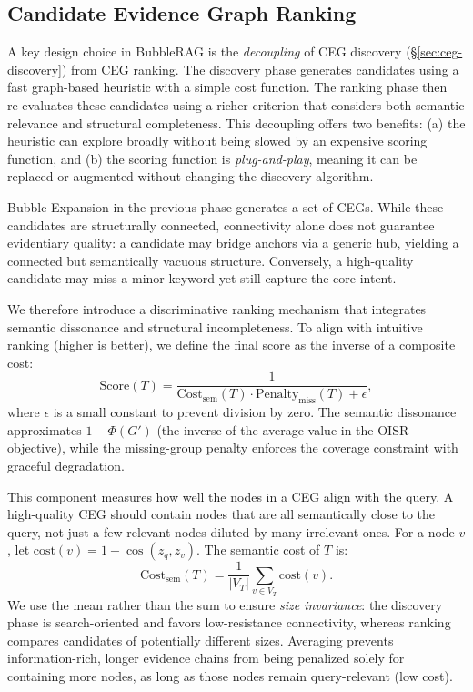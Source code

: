 \subsection{Candidate Evidence Graph Ranking}\label{sec:ceg-ranking}


A key design choice in BubbleRAG is the \emph{decoupling} of CEG discovery (\S\ref{sec:ceg-discovery}) from CEG ranking. The discovery phase generates candidates using a fast graph-based heuristic with a simple cost function. The ranking phase then re-evaluates these candidates using a richer criterion that considers both semantic relevance and structural completeness. This decoupling offers two benefits: (a) the heuristic can explore broadly without being slowed by an expensive scoring function, and (b) the scoring function is \emph{plug-and-play}, meaning it can be replaced or augmented without changing the discovery algorithm.

Bubble Expansion in the previous phase generates a set of CEGs.
While these candidates are structurally connected, connectivity alone does not
guarantee evidentiary quality: a candidate may bridge anchors via a generic hub,
yielding a connected but semantically vacuous structure. Conversely, a
high-quality candidate may miss a minor keyword yet still capture the core
intent.

We therefore introduce a discriminative ranking mechanism that integrates
semantic dissonance and structural incompleteness. To align with
intuitive ranking (higher is better), we define the final score as the inverse
of a composite cost:
\begin{equation}
\text{Score}(T) = \frac{1}{\text{Cost}_{\text{sem}}(T)\cdot \text{Penalty}_{\text{miss}}(T) + \epsilon},
\label{eq:score}
\end{equation}
where $\epsilon$ is a small constant to prevent division by zero. The semantic dissonance approximates $1 - \Phi(G')$ (the inverse of the average value in the OISR objective), while the missing-group penalty enforces the coverage constraint with graceful degradation.

This component measures how well the nodes in a CEG align with the query. A high-quality CEG should contain nodes that are all semantically close to the query, not just a few relevant nodes diluted by many irrelevant ones.
For a node $v$, let $\text{cost}(v)=1-\cos(z_q,z_v)$. The semantic
cost of $T$ is:
\[
\text{Cost}_{\text{sem}}(T) = \frac{1}{|V_T|} \sum_{v \in V_T} \text{cost}(v).
\]
We use the mean rather than the sum to ensure \textit{size invariance}: the discovery phase
is search-oriented and favors low-resistance connectivity, whereas ranking
compares candidates of potentially different sizes. Averaging prevents
information-rich, longer evidence chains from being penalized solely for containing more nodes, as long as those nodes
remain query-relevant (low cost).

